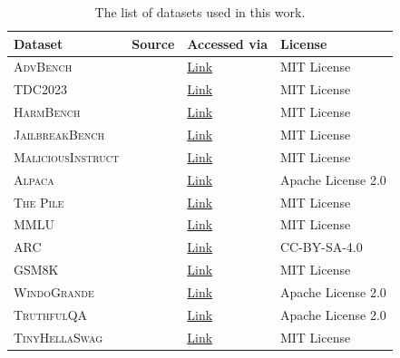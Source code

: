 \documentclass{article}
\begin{document}
\begin{table}[ht]
\centering
\caption{The list of datasets used in this work.}
\begin{tabularx}{0.975\textwidth}{l l l l}
\toprule
Dataset & Source & Accessed via & License \\
\midrule
\textsc{AdvBench} & \citet{zou2023universal} & \href{https://github.com/llm-attacks/llm-attacks}{Link} & MIT License \\
\textsc{TDC2023} & \citet{mazeika2024harmbench, tdc2023} & \href{https://github.com/centerforaisafety/tdc2023-starter-kit}{Link} & MIT License \\
\textsc{HarmBench} & \citet{mazeika2024harmbench} & \href{https://github.com/centerforaisafety/HarmBench/tree/main}{Link} & MIT License \\
\textsc{JailbreakBench} & \citet{chao2024jailbreakbench} & \href{https://github.com/JailbreakBench/jailbreakbench/tree/main}{Link} & MIT License \\
\textsc{MaliciousInstruct} & \citet{huang2023catastrophic} & \href{https://github.com/princeton-sysml/jailbreak_llm}{Link} & MIT License \\
\textsc{Alpaca} & \citet{alpaca} & \href{https://huggingface.co/datasets/tatsu-lab/alpaca}{Link} & Apache License 2.0 \\
\textsc{The Pile} & \citet{gao2020pile} & \href{https://huggingface.co/datasets/monology/pile-uncopyrighted}{Link} & MIT License \\
\textsc{MMLU} & \citet{hendrycks2020measuring_mmlu} & \href{https://huggingface.co/datasets/cais/mmlu}{Link} & MIT License \\
\textsc{ARC} & \citet{clark2018think} & \href{https://huggingface.co/datasets/allenai/ai2_arc}{Link} & CC-BY-SA-4.0 \\
\textsc{GSM8K} & \citet{cobbe2021training} & \href{https://huggingface.co/datasets/openai/gsm8k}{Link} & MIT License \\
\textsc{WindoGrande} & \citet{sakaguchi2021winogrande} & \href{https://huggingface.co/datasets/allenai/winogrande}{Link} & Apache License 2.0 \\
\textsc{TruthfulQA} & \citet{lin2021truthfulqa} & \href{https://huggingface.co/datasets/truthfulqa/truthful_qa}{Link} & Apache License 2.0 \\
\textsc{TinyHellaSwag} & \citet{polo2024tinybenchmarks} & \href{https://huggingface.co/datasets/tinyBenchmarks/tinyHellaswag}{Link} & MIT License \\

\bottomrule
\end{tabularx}
\label{tab:list_of_datasets}
\end{table}
\end{document}
